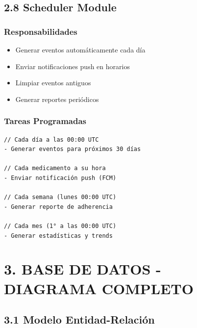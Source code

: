 \documentclass[12pt,a4paper]{article}
\begin{document}
\subsection{2.8 Scheduler Module}

\subsubsection{Responsabilidades}
\begin{itemize}
    \item Generar eventos automáticamente cada día
    \item Enviar notificaciones push en horarios
    \item Limpiar eventos antiguos
    \item Generar reportes periódicos
\end{itemize}

\subsubsection{Tareas Programadas}

\begin{verbatim}
// Cada día a las 00:00 UTC
- Generar eventos para próximos 30 días

// Cada medicamento a su hora
- Enviar notificación push (FCM)

// Cada semana (lunes 00:00 UTC)
- Generar reporte de adherencia

// Cada mes (1° a las 00:00 UTC)
- Generar estadísticas y trends
\end{verbatim}

\section{3. BASE DE DATOS - DIAGRAMA COMPLETO}

\subsection{3.1 Modelo Entidad-Relación}
\end{document}
